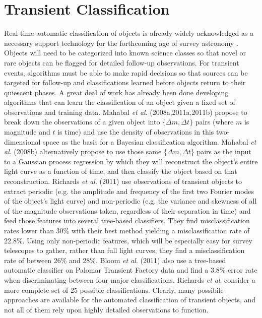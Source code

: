 \documentclass[prd, nofootinbib, floatfix, 12pt,tightenlines]{revtex4}
\begin{document}
\section{Transient Classification}
\label{sec:transient}

Real-time automatic classification of objects is already widely acknowledged as a
necessary support technology for the forthcoming age of survey astronomy
\cite{djorgovski2011,richards2011,richards2012,graham2012,mahabal2008a,mahabal2011a}.
Objects will need to be categorized into known science classes so that novel
or rare objects can be flagged for detailed follow-up observations.
For transient events, algorithms must be able to make rapid
decisions so that sources can be targeted for follow-up 
and classifications learned before
objects return to their quiescent phases.  A great deal of work has
already been done developing algorithms that can learn the classification of an
object given a fixed set of observations and training data.  
Mahabal {\it et al}. (2008a,2011a,2011b) propose to break down the
observations of a given object into $\{\Delta m,\Delta t\}$ pairs (where $m$
is magnitude and $t$ is time) and use the density of observations in this 
two-dimensional space as the basis for a Bayesian classification algorithm.
Mahabal {\it et al}. (2008b) alternatively propose to use those same 
$\{\Delta m,\Delta t\}$ pairs as the input to a Gaussian process regression
by which they will reconstruct the object's entire light curve as a function
of time, and then classify the object based on that reconstruction.
Richards {\it et al}. (2011) use observations of transient objects to extract
periodic (e.g. the amplitude and frequency of the first two Fourier modes of
the object's light curve) and non-periodic (e.g. the variance and skewness of
all of the magnitude observations taken, regardless of their separation in
time) and feed those features into several tree-based classifiers.
They find misclassification rates lower than 30\% with their best method yielding a
misclassification rate of 22.8\%.  Using only non-periodic features, which will be
especially easy for survey telescopes to gather, rather than
full light curves, they 
find a misclassification rate of
between 26\% and 28\%.
Bloom {\it et al}. (2011) also use a tree-based automatic classifier on
Palomar Transient Factory data and find a 3.8\% error rate when
discriminating between four major classifications.  Richards {\it et al}.
consider a more complete set of 25 possible classifications.
Clearly, many possibile approaches are available for the automated
classification of transient objects, and not all of them rely upon highly
detailed observations to function.
\end{document}
